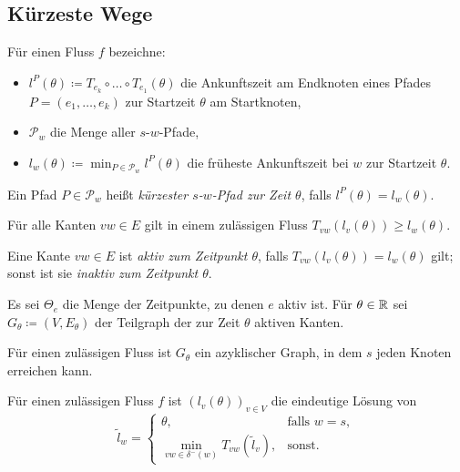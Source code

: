 \subsection{Kürzeste Wege}

\begin{frame}
	\begin{definition}
		Für einen Fluss $f$ bezeichne:
		\begin{itemize}[label=\color{darkblue}$\bullet$]
			\item\pause $l^P(\theta)\coloneq T_{e_k}\circ\dots\circ T_{e_1}(\theta)$ die Ankunftszeit am Endknoten eines Pfades $P=(e_1,\dots,e_k)$ zur Startzeit $\theta$ am Startknoten,
			\item\pause $\mathcal{P}_w$ die Menge aller $s$-$w$-Pfade,
			\item\pause $l_w(\theta) \coloneq \min_{P\in\mathcal{P}_w} l^P(\theta)$ die früheste Ankunftszeit bei $w$ zur Startzeit $\theta$.
		\end{itemize}
	\pause Ein Pfad $P\in \mathcal{P}_w$ heißt \emph{kürzester $s$-$w$-Pfad zur Zeit $\theta$}, falls $l^P(\theta)=l_w(\theta)$.
	\end{definition}
	\pause\begin{lemma}[Dreiecksungleichung]
		Für alle Kanten $vw\in E$ gilt in einem zulässigen Fluss $T_{vw}(l_v(\theta))\geq l_w(\theta)$.
	\end{lemma}
\end{frame}

\begin{frame}
	\begin{definition}
		Eine Kante $vw\in E$ ist \emph{aktiv zum Zeitpunkt $\theta$}, falls $T_{vw}(l_v(\theta)) = l_w(\theta)$ gilt; sonst ist sie \emph{inaktiv zum Zeitpunkt $\theta$}.
		
		\pause
		Es sei $\Theta_e$ die Menge der Zeitpunkte, zu denen $e$ aktiv ist.
		Für $\theta\in\mathbb{R}$ sei $G_\theta\coloneq (V, E_\theta)$ der Teilgraph der zur Zeit $\theta$ aktiven Kanten.
	\end{definition}
	\pause\begin{lemma}
		Für einen zulässigen Fluss ist $G_\theta$ ein azyklischer Graph, in dem $s$ jeden Knoten erreichen kann.
	\end{lemma}
	\pause\begin{proposition}
			Für einen zulässigen Fluss $f$ ist $(l_v(\theta))_{v\in V}$ die eindeutige Lösung von
		\[ \tilde{l}_w = \begin{cases}
		\theta, & \text{falls } w=s, \\
		\min\limits_{vw\in \delta^-(w)} T_{vw}(\tilde{l}_v), & \text{sonst}.
		\end{cases} \]
	\end{proposition}
\end{frame}